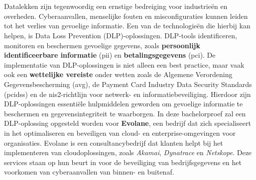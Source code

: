 
\chapter{}%
\label{ch:inleiding}


Datalekken zijn tegenwoordig een ernstige bedreiging voor industrieën en overheden. 
Cyberaanvallen, menselijke fouten en misconfiguraties kunnen leiden tot het verlies van gevoelige informatie. 
Een van de technologieën die hierbij kan helpen, is Data Loss Prevention (DLP)-oplossingen.
DLP-tools identificeren, monitoren en beschermen gevoelige gegevens, zoals \textbf{persoonlijk identificeerbare informatie} (\gls{pii}) en \textbf{betalingsgegevens} (\gls{pci}). 
De implementatie van DLP-oplossingen is niet alleen een best practice, maar vaak ook een \textbf{wettelijke vereiste} onder wetten zoals de 
Algemene Verordening Gegevensbescherming (\gls{avg}), de Payment Card Industry Data Security Standards (\gls{pcidss}) en de \gls{nis2}-richtlijn voor netwerk- en informatiebeveiliging.
Hierdoor zijn DLP-oplossingen essentiële hulpmiddelen geworden om gevoelige informatie te beschermen en gegevensintegriteit te waarborgen. 
In deze bachelorproef zal een DLP-oplossing opgesteld worden voor \textbf{Evolane}, een bedrijf dat zich specialiseert in het optimaliseren en beveiligen van cloud- en enterprise-omgevingen voor organisaties. 
Evolane is een consultancybedrijf dat klanten helpt bij het implementeren van cloudoplossingen, zoals \textit{Akamai}, \textit{Dynatrace} en \textit{Netskope}. 
Deze services staan op hun beurt in voor de beveiliging van bedrijfsgegevens en het voorkomen van cyberaanvallen van binnen- en buitenaf. 

